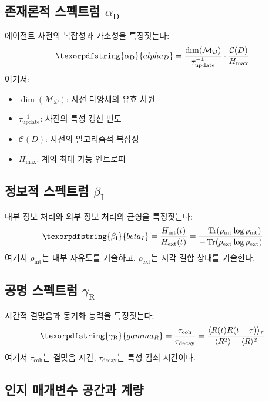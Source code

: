 \documentclass[11pt,a4paper]{article}
\DeclareMathOperator{\Tr}{Tr}
\DeclareRobustCommand{\alD}{\texorpdfstring{\ensuremath{\alpha_{\mathrm{D}}}}{alpha_D}}
\DeclareRobustCommand{\beI}{\texorpdfstring{\ensuremath{\beta_{\mathrm{I}}}}{beta_I}}
\DeclareRobustCommand{\gaR}{\texorpdfstring{\ensuremath{\gamma_{\mathrm{R}}}}{gamma_R}}
\newcommand{\Dict}{\mathcal{D}}
\newcommand{\Mdict}{\mathcal{M}_{\Dict}}
\begin{document}
	\subsection{존재론적 스펙트럼 \alD}
	
	에이전트 사전의 복잡성과 가소성을 특징짓는다:
	\begin{equation}
		\label{eq:alphaD}
		\alD = \frac{\dim(\Mdict)}{\tau_{\mathrm{update}}^{-1}} \cdot \frac{\mathcal{C}(D)}{H_{\mathrm{max}}}
	\end{equation}
	여기서:
	\begin{itemize}
		\item \(\dim(\Mdict)\): 사전 다양체의 유효 차원
		\item \(\tau_{\mathrm{update}}^{-1}\): 사전의 특성 갱신 빈도
		\item \(\mathcal{C}(D)\): 사전의 알고리즘적 복잡성
		\item \(H_{\mathrm{max}}\): 계의 최대 가능 엔트로피
	\end{itemize}
	
	\subsection{정보적 스펙트럼 \beI}
	
	내부 정보 처리와 외부 정보 처리의 균형을 특징짓는다:
	\begin{equation}
		\label{eq:betaI}
		\beI = \frac{H_{\mathrm{int}}(t)}{H_{\mathrm{ext}}(t)} = \frac{-\Tr(\rho_{\mathrm{int}}\log\rho_{\mathrm{int}})}{-\Tr(\rho_{\mathrm{ext}}\log\rho_{\mathrm{ext}})}
	\end{equation}
	여기서 \(\rho_{\mathrm{int}}\)는 내부 자유도를 기술하고, \(\rho_{\mathrm{ext}}\)는 지각 결합 상태를 기술한다.
	
	\subsection{공명 스펙트럼 \gaR}
	
	시간적 결맞음과 동기화 능력을 특징짓는다:
	\begin{equation}
		\label{eq:gammaR}
		\gaR = \frac{\tau_{\mathrm{coh}}}{\tau_{\mathrm{decay}}} = \frac{\langle R(t)R(t+\tau)\rangle_\tau}{\langle R^2\rangle - \langle R\rangle^2}
	\end{equation}
	여기서 \(\tau_{\mathrm{coh}}\)는 결맞음 시간, \(\tau_{\mathrm{decay}}\)는 특성 감쇠 시간이다.
	
	\subsection{인지 매개변수 공간과 계량}
	
\end{document}
